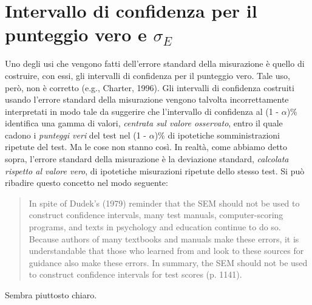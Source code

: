 \section{Intervallo di confidenza per il punteggio vero e $\sigma_E$}

Uno degli usi che vengono fatti dell'errore standard della misurazione è quello di costruire, con essi, gli intervalli di confidenza per il punteggio vero.
Tale uso, però, non è corretto (e.g., Charter, 1996).
Gli intervalli di confidenza costruiti usando l'errore standard della misurazione 
vengono talvolta incorrettamente interpretati in  modo tale da suggerire che l'intervallo di confidenza al (1 - $\alpha$)\% identifica una gamma di valori, \emph{centrata sul valore osservato}, entro il quale cadono i \emph{punteggi veri} del test nel (1 - $\alpha$)\% di ipotetiche somministrazioni ripetute del test.
Ma le cose non stanno così.
In realtà, come abbiamo detto sopra, l'errore standard della misurazione è la deviazione standard, \emph{calcolata rispetto al valore vero}, di ipotetiche misurazioni ripetute dello stesso test.
Si può ribadire questo concetto nel modo seguente:
\begin{quotation}
In spite of Dudek's (1979) reminder that the SEM should not be used to construct confidence intervals, many test manuals, computer-scoring programs, and texts in psychology and education continue to do so. Because authors of many textbooks and manuals make these errors, it is understandable that those who learned from and look to these sources for guidance also make these errors. In summary, the SEM should not be used to construct confidence intervals for test scores (p. 1141).
\end{quotation}
Sembra piuttosto chiaro.

